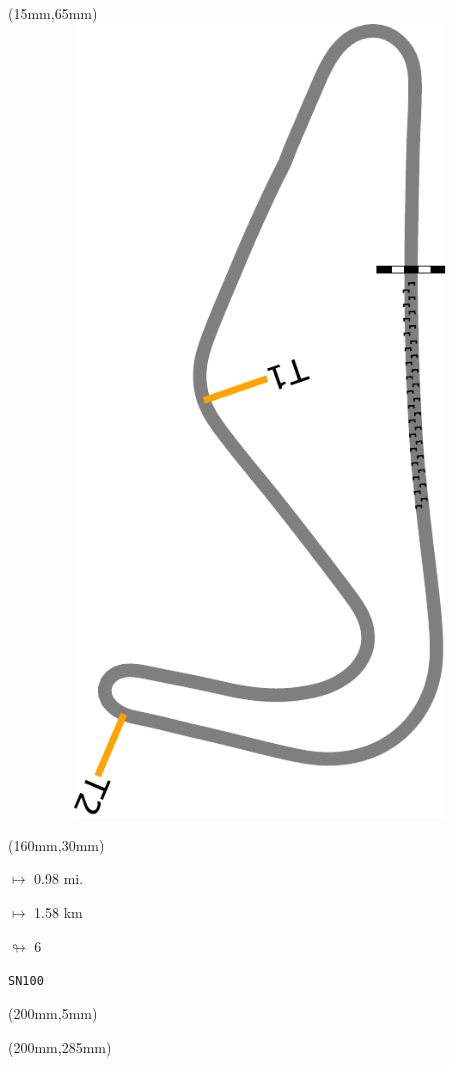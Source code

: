 \begin{textblock*}{185mm}(15mm,65mm)%
\centering
\mbox{\includegraphics[width=185mm,height=210mm,keepaspectratio]{PT/SN100.pdf}}
\end{textblock*}
\begin{textblock*}{40mm}(160mm,30mm)%
\Large
\par$\mapsto$ 0.98 mi.
\par$\mapsto$ 1.58 km
\par$\looparrowright$ 6
\par\hfill\tiny\tt SN100\\
\end{textblock*}
\begin{textblock*}{20mm}(200mm,5mm)%
\fbox{\thepage}
\label{SN100}
\end{textblock*}
\begin{textblock*}{20mm}(200mm,285mm)%
\fbox{\thepage}
\end{textblock*}

